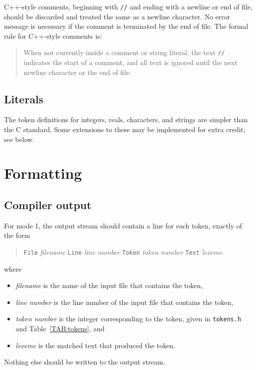 \documentclass{article}
\begin{document}
C++-style comments, beginning with \verb|//|
and ending with a newline or end of file,
should be discarded and treated the same as a newline character.
No error message is necessary if the comment is terminated by the end of file.
The formal rule for C++-style comments is:
\begin{quote}
	When not currently inside a comment or string literal,
	the text \verb|//| indicates the start of a comment,
	and all text is ignored until the next newline character or the end of file.
\end{quote}

\subsection{Literals}

The token definitions for integers, reals, characters, and strings
are simpler than the C standard.
Some extensions to these may be implemented for extra credit;
see below.


\section{Formatting}

\subsection{Compiler output}

For mode 1, the output stream should contain
a line for each token, exactly of the form
\begin{quote}
	{\tt File}
	\emph{filename}
	{\tt Line}
	\emph{line number}
	{\tt Token}
	\emph{token number}
	{\tt Text}
	\emph{lexeme}
\end{quote}
where
\begin{itemize}
	\item \emph{filename}
		is the name of the input file that contains the token,
	\item \emph{line number}
		is the line number of the input file that contains the token,
	\item \emph{token number}
		is the integer corresponding to the token, given in \verb|tokens.h|
		and Table~\ref{TAB:tokens}, and
	\item \emph{lexeme}
		is the matched text that produced the token.
\end{itemize}
Nothing else should be written to the output stream.
\end{document}
